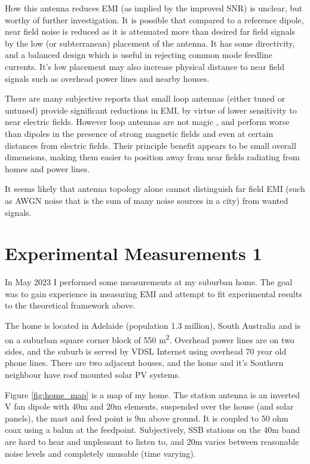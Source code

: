 \documentclass{article}
\begin{document}
How this antenna reduces EMI (as implied by the improved SNR) is unclear, but worthy of further investigation. It is possible that compared to a reference dipole, near field noise is reduced as it is attenuated more than desired far field signals by the low (or subterranean) placement of the antenna.  It has some directivity, and a balanced design which is useful in rejecting common mode feedline currents.  It's low placement may also increase physical distance to near field signals such as overhead power lines and nearby houses. 

There are many subjective reports that small loop antennas (either tuned or untuned) provide significant reductions in EMI, by virtue of lower sensitivity to near electric fields.  However loop antennas are not magic \cite{w8ji_radio_noise}, and perform worse than dipoles in the presence of strong magnetic fields and even at certain distances from electric fields.  Their principle benefit appears to be small overall dimensions, making them easier to position away from near fields radiating from homes and power lines.

It seems likely that antenna topology alone cannot distinguish far field EMI (such as AWGN noise that is the sum of many noise sources in a city) from wanted signals.

\section{Experimental Measurements 1}

In May 2023 I performed some measurements at my suburban home.  The goal was to gain experience in measuring EMI and attempt to fit experimental results to the theoretical framework above.

The home is located in Adelaide (population 1.3 million), South Australia and is on a suburban square corner block of 550 \si{\metre\squared}.  Overhead power lines are on two sides, and the suburb is served by VDSL Internet using overhead 70 year old phone lines.  There are two adjacent houses, and the home and it's Southern neighbour have roof mounted solar PV systems.

Figure \ref{fig:home_map} is a map of my home. The station antenna is an inverted V fan dipole with 40m and 20m elements, suspended over the house (and solar panels), the mast and feed point is 9m above ground. It is coupled to 50 ohm coax using a balun at the feedpoint. Subjectively, SSB stations on the 40m band are hard to hear and unpleasant to listen to, and 20m varies between reasonable noise levels and completely unusable (time varying).
\end{document}
